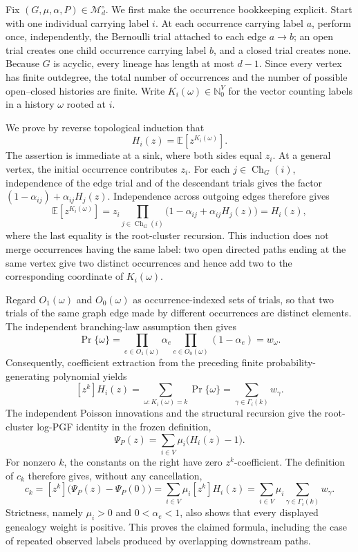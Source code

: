 Fix \((G,\mu,\alpha,P)\in\mathcal M_d^\circ\).  We first make the occurrence bookkeeping explicit.  Start with one individual carrying label \(i\).  At each occurrence carrying label \(a\), perform once, independently, the Bernoulli trial attached to each edge \(a\to b\); an open trial creates one child occurrence carrying label \(b\), and a closed trial creates none.  Because \(G\) is acyclic, every lineage has length at most \(d-1\).  Since every vertex has finite outdegree, the total number of occurrences and the number of possible open--closed histories are finite.  Write \(K_i(\omega)\in\mathbb N_0^V\) for the vector counting labels in a history \(\omega\) rooted at \(i\).

We prove by reverse topological induction that
\[
 H_i(z)=\mathbb E\!\left[z^{K_i(\omega)}\right].
\]
The assertion is immediate at a sink, where both sides equal \(z_i\).  At a general vertex, the initial occurrence contributes \(z_i\).  For each \(j\in\operatorname{Ch}_G(i)\), independence of the edge trial and of the descendant trials gives the factor \((1-\alpha_{ij})+\alpha_{ij}H_j(z)\).  Independence across outgoing edges therefore gives
\[
 \mathbb E\!\left[z^{K_i(\omega)}\right]
 =z_i\prod_{j\in\operatorname{Ch}_G(i)}
       \bigl(1-\alpha_{ij}+\alpha_{ij}H_j(z)\bigr)
 =H_i(z),
\]
where the last equality is the root-cluster recursion.  This induction does not merge occurrences having the same label: two open directed paths ending at the same vertex give two distinct occurrences and hence add two to the corresponding coordinate of \(K_i(\omega)\).

Regard \(O_1(\omega)\) and \(O_0(\omega)\) as occurrence-indexed sets of trials, so that two trials of the same graph edge made by different occurrences are distinct elements.  The independent branching-law assumption then gives
\[
 \Pr\{\omega\}
 =\prod_{e\in O_1(\omega)}\alpha_e
   \prod_{e\in O_0(\omega)}(1-\alpha_e)
 =w_\omega.
\]
Consequently, coefficient extraction from the preceding finite probability-generating polynomial yields
\[
 [z^k]H_i(z)
 =\sum_{\omega:K_i(\omega)=k}\Pr\{\omega\}
 =\sum_{\gamma\in\Gamma_i(k)}w_\gamma.
\]
The independent Poisson innovations and the structural recursion give the root-cluster log-PGF identity in the frozen definition,
\[
 \Psi_P(z)=\sum_{i\in V}\mu_i\bigl(H_i(z)-1\bigr).
\]
For nonzero \(k\), the constants on the right have zero \(z^k\)-coefficient.  The definition of \(c_k\) therefore gives, without any cancellation,
\[
 c_k=[z^k]\bigl(\Psi_P(z)-\Psi_P(0)\bigr)
 =\sum_{i\in V}\mu_i[z^k]H_i(z)
 =\sum_{i\in V}\mu_i\sum_{\gamma\in\Gamma_i(k)}w_\gamma.
\]
Strictness, namely \(\mu_i>0\) and \(0<\alpha_e<1\), also shows that every displayed genealogy weight is positive.  This proves the claimed formula, including the case of repeated observed labels produced by overlapping downstream paths.

